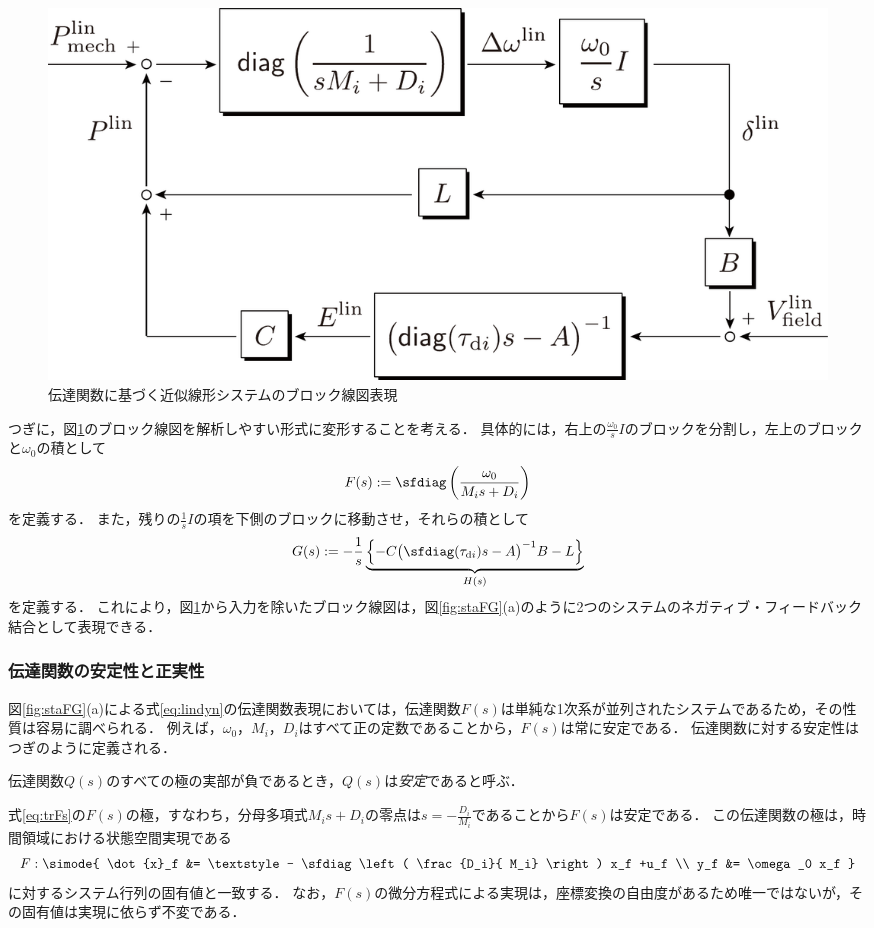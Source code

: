 \documentclass[a4j,10pt,oneside,openany,dvipdfmx]{jsbook}
\begin{document}
\begin{figure}[t]
\centering
\includegraphics[width = .50\linewidth]{figs/blocklinsys2}
\caption{伝達関数に基づく近似線形システムのブロック線図表現}
\label{fig:blocklin}
\end{figure}




つぎに，図\ref{fig:blocklin}のブロック線図を解析しやすい形式に変形することを考える．
具体的には，右上の$\frac{\omega_0}{s}I$のブロックを分割し，左上のブロックと$\omega_0$の積として
\begin{equation}\label{eq:trFs}
F(s) :=  
\sfdiag \left( 
\frac{\omega_0}{M_i s + D_i}
\right)
\end{equation}
を定義する．
また，残りの$\frac{1}{s}I$の項を下側のブロックに移動させ，それらの積として
\begin{equation}\label{eq:trGs}
G(s) :=  - \frac{1}{s} 
\underbrace{
\left\{ -C \bigl( \sfdiag(\tau_{{\rm d}i})s -A \bigr)^{-1} B - L \right\}
}_{H(s)}
\end{equation}
を定義する．
これにより，図\ref{fig:blocklin}から入力を除いたブロック線図は，図\ref{fig:staFG}(a)のように2つのシステムのネガティブ・フィードバック結合として表現できる．

\subsubsection{伝達関数の安定性と正実性}

図\ref{fig:staFG}(a)による式\eqref{eq:lindyn}の伝達関数表現においては，伝達関数$F(s)$は単純な1次系が並列されたシステムであるため，その性質は容易に調べられる．
例えば，$\omega_0$，$M_i$，$D_i$はすべて正の定数であることから，$F(s)$は常に安定である．
伝達関数に対する安定性はつぎのように定義される．

\begin{definition}\label{def:trsta}
伝達関数$Q(s)$のすべての極の実部が負であるとき，$Q(s)$は\emph{安定}であると呼ぶ．
\end{definition}

式\eqref{eq:trFs}の$F(s)$の極，すなわち，分母多項式$M_i s + D_i$の零点は$s=-\frac{D_i}{M_i}$であることから$F(s)$は安定である．
この伝達関数の極は，時間領域における状態空間実現である
\begin{equation}\label{eq:Fss}
F: \simode{
\dot{x}_f &= \textstyle - \sfdiag \left( 
\frac{D_i}{ M_i} 
\right)
x_f
+u_f \\
y_f &= \omega_0 x_f
}
\end{equation}
に対するシステム行列の固有値と一致する．
なお，$F(s)$の微分方程式による実現は，座標変換の自由度があるため唯一ではないが，その固有値は実現に依らず不変である．
\end{document}
